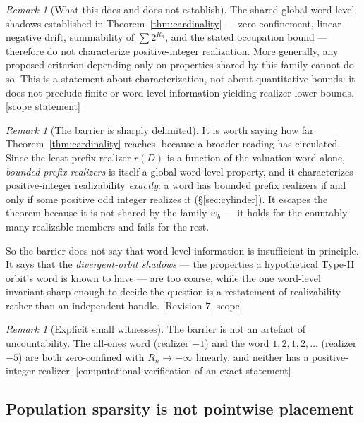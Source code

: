 \documentclass[11pt]{article}
\theoremstyle{plain}
\theoremstyle{definition}
\theoremstyle{remark}
\newtheorem{remark}[theorem]{Remark}
\newcommand{\status}[1]{\textsf{\footnotesize[#1]}}
\begin{document}
\begin{remark}[What this does and does not establish]\label{rem:cardscope}
The shared global word-level shadows established in Theorem~\ref{thm:cardinality} --- zero
confinement, linear negative drift, summability of $\sum2^{R_n}$, and the stated occupation bound
--- therefore do not characterize positive-integer realization. More generally, any proposed
criterion depending only on properties shared by this family cannot do so. This is a statement
about characterization, not about quantitative bounds: it does not preclude finite or word-level
information yielding realizer lower bounds. \status{scope statement}
\end{remark}

\begin{remark}[The barrier is sharply delimited]\label{rem:zcrecounter}
It is worth saying how far Theorem~\ref{thm:cardinality} reaches, because a broader reading has
circulated. Since the least prefix realizer $r(D)$ is a function of the valuation word alone,
\emph{bounded prefix realizers} is itself a global word-level property, and it characterizes
positive-integer realizability \emph{exactly}: a word has bounded prefix realizers if and only if
some positive odd integer realizes it (\S\ref{sec:cylinder}). It escapes the theorem because it is
not shared by the family $w_b$ --- it holds for the countably many realizable members and fails for
the rest.

So the barrier does not say that word-level information is insufficient in principle. It says that
the \emph{divergent-orbit shadows} --- the properties a hypothetical Type-II orbit's word is known
to have --- are too coarse, while the one word-level invariant sharp enough to decide the question
is a restatement of realizability rather than an independent handle. \status{Revision 7, scope}
\end{remark}

\begin{remark}[Explicit small witnesses]
The barrier is not an artefact of uncountability. The all-ones word (realizer $-1$) and the word
$1,2,1,2,\dots$ (realizer $-5$) are both zero-confined with $R_n\to-\infty$ linearly, and neither
has a positive-integer realizer. \status{computational verification of an exact statement}
\end{remark}

\subsection{Population sparsity is not pointwise placement}
\end{document}
